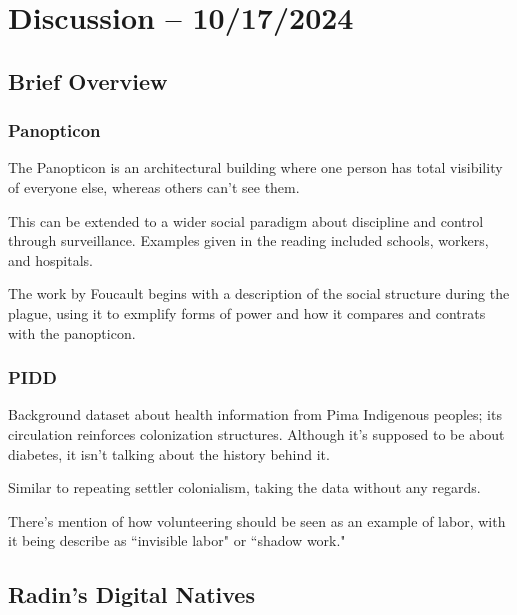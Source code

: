 \documentclass[openany]{book}
\begin{document}
\section{Discussion -- 10/17/2024}
\subsection{Brief Overview}
\subsubsection{Panopticon}
The Panopticon is an architectural building where one person has total visibility of everyone else, whereas others can't see them.

This can be extended to a wider social paradigm about discipline and control through surveillance. Examples given in the reading included schools, workers, and hospitals.

The work by Foucault begins with a description of the social structure during the plague, using it to exmplify forms of power and how it compares and contrats with the panopticon.

\subsubsection{PIDD}
Background dataset about health information from Pima Indigenous peoples; its circulation reinforces colonization structures. Although it's supposed to be about diabetes, it isn't talking about the history behind it.

Similar to repeating settler colonialism, taking the data without any regards. 

There's mention of how volunteering should be seen as an example of labor, with it being describe as ``invisible labor" or ``shadow work."

\subsection{Radin's Digital Natives}
\end{document}
